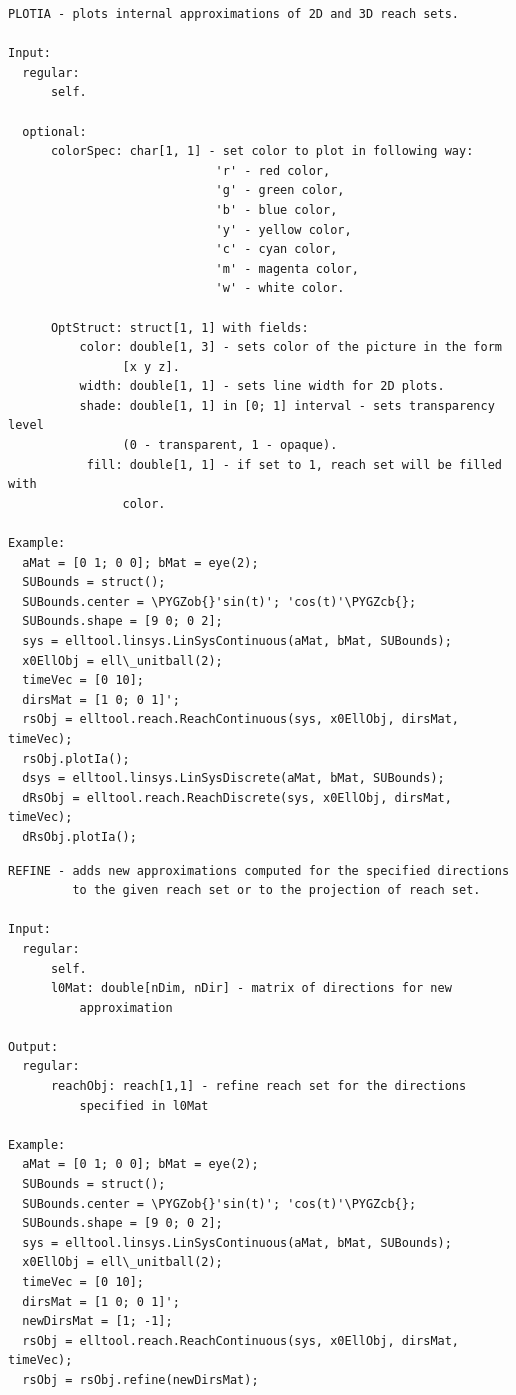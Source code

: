\documentclass[letterpaper,10pt,english]{sphinxmanual}
\def\PYGZob{\char`\{}
\def\PYGZcb{\char`\}}
\begin{document}
\begin{Verbatim}[commandchars=\\\{\}]
PLOTIA - plots internal approximations of 2D and 3D reach sets.

Input:
  regular:
      self.

  optional:
      colorSpec: char[1, 1] - set color to plot in following way:
                             'r' - red color,
                             'g' - green color,
                             'b' - blue color,
                             'y' - yellow color,
                             'c' - cyan color,
                             'm' - magenta color,
                             'w' - white color.

      OptStruct: struct[1, 1] with fields:
          color: double[1, 3] - sets color of the picture in the form
                [x y z].
          width: double[1, 1] - sets line width for 2D plots.
          shade: double[1, 1] in [0; 1] interval - sets transparency level
                (0 - transparent, 1 - opaque).
           fill: double[1, 1] - if set to 1, reach set will be filled with
                color.

Example:
  aMat = [0 1; 0 0]; bMat = eye(2);
  SUBounds = struct();
  SUBounds.center = \PYGZob{}'sin(t)'; 'cos(t)'\PYGZcb{};
  SUBounds.shape = [9 0; 0 2];
  sys = elltool.linsys.LinSysContinuous(aMat, bMat, SUBounds);
  x0EllObj = ell\_unitball(2);
  timeVec = [0 10];
  dirsMat = [1 0; 0 1]';
  rsObj = elltool.reach.ReachContinuous(sys, x0EllObj, dirsMat, timeVec);
  rsObj.plotIa();
  dsys = elltool.linsys.LinSysDiscrete(aMat, bMat, SUBounds);
  dRsObj = elltool.reach.ReachDiscrete(sys, x0EllObj, dirsMat, timeVec);
  dRsObj.plotIa();
\end{Verbatim}

\begin{Verbatim}[commandchars=\\\{\}]
REFINE - adds new approximations computed for the specified directions
         to the given reach set or to the projection of reach set.

Input:
  regular:
      self.
      l0Mat: double[nDim, nDir] - matrix of directions for new
          approximation

Output:
  regular:
      reachObj: reach[1,1] - refine reach set for the directions
          specified in l0Mat

Example:
  aMat = [0 1; 0 0]; bMat = eye(2);
  SUBounds = struct();
  SUBounds.center = \PYGZob{}'sin(t)'; 'cos(t)'\PYGZcb{};
  SUBounds.shape = [9 0; 0 2];
  sys = elltool.linsys.LinSysContinuous(aMat, bMat, SUBounds);
  x0EllObj = ell\_unitball(2);
  timeVec = [0 10];
  dirsMat = [1 0; 0 1]';
  newDirsMat = [1; -1];
  rsObj = elltool.reach.ReachContinuous(sys, x0EllObj, dirsMat, timeVec);
  rsObj = rsObj.refine(newDirsMat);
\end{Verbatim}
\end{document}
